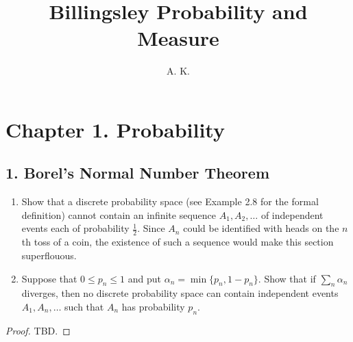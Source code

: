 \documentclass[12pt]{article}
\newenvironment{exercise}[2][Exercise]{\begin{trivlist}
\item[\hskip \labelsep {\bfseries #1}\hskip \labelsep {\bfseries #2.}]}{\end{trivlist}}
\begin{document}
\title{Billingsley Probability and Measure}%
\author{A. K.} %

\maketitle

\section*{Chapter 1. Probability}
\subsection*{1. Borel's Normal Number Theorem}
\begin{exercise}{1.1}
    \begin{enumerate}
        \item Show that a discrete probability space (see Example 2.8 for the formal definition) cannot contain an infinite sequence $A_1, A_2, \ldots$ of independent events each of probability $\frac{1}{2}$. Since $A_n$ could be identified with heads on the $n$th toss of a coin, the existence of such a sequence would make this section superflouous.
        \item Suppose that $0 \leq p_n \leq 1$ and put $\alpha_n = \min \{ p_n, 1 - p_n \}$. Show that if $\sum_n \alpha_n$ diverges, then no discrete probability space can contain independent events $A_1, A_n, \ldots$ such that $A_n$ has probability $p_n$.
    \end{enumerate}
\end{exercise}
\begin{proof}
    TBD.
\end{proof}
\end{document}
